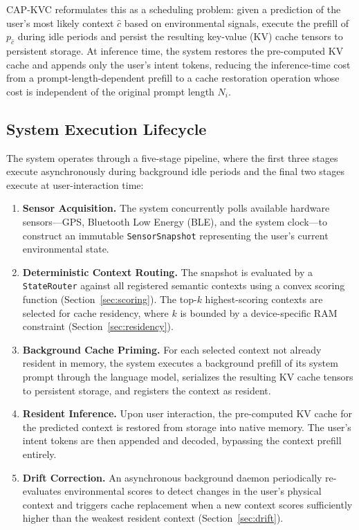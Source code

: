 \documentclass[journal]{IEEEtran}
\begin{document}
CAP-KVC reformulates this as a scheduling problem: given a prediction of the user's most likely context $\hat{c}$ based on environmental signals, execute the prefill of $p_{\hat{c}}$ during idle periods and persist the resulting key-value (KV) cache tensors to persistent storage. At inference time, the system restores the pre-computed KV cache and appends only the user's intent tokens, reducing the inference-time cost from a prompt-length-dependent prefill to a cache restoration operation whose cost is independent of the original prompt length $N_i$.

\subsection{System Execution Lifecycle}
\label{sec:lifecycle}

The system operates through a five-stage pipeline, where the first three stages execute asynchronously during background idle periods and the final two stages execute at user-interaction time:

\begin{enumerate}
    \item \textbf{Sensor Acquisition.} The system concurrently polls available hardware sensors---GPS, Bluetooth Low Energy (BLE), and the system clock---to construct an immutable \texttt{SensorSnapshot} representing the user's current environmental state.

    \item \textbf{Deterministic Context Routing.} The snapshot is evaluated by a \texttt{StateRouter} against all registered semantic contexts using a convex scoring function (Section~\ref{sec:scoring}). The top-$k$ highest-scoring contexts are selected for cache residency, where $k$ is bounded by a device-specific RAM constraint (Section~\ref{sec:residency}).

    \item \textbf{Background Cache Priming.} For each selected context not already resident in memory, the system executes a background prefill of its system prompt through the language model, serializes the resulting KV cache tensors to persistent storage, and registers the context as resident.

    \item \textbf{Resident Inference.} Upon user interaction, the pre-computed KV cache for the predicted context is restored from storage into native memory. The user's intent tokens are then appended and decoded, bypassing the context prefill entirely.

    \item \textbf{Drift Correction.} An asynchronous background daemon periodically re-evaluates environmental scores to detect changes in the user's physical context and triggers cache replacement when a new context scores sufficiently higher than the weakest resident context (Section~\ref{sec:drift}).
\end{enumerate}
\end{document}
